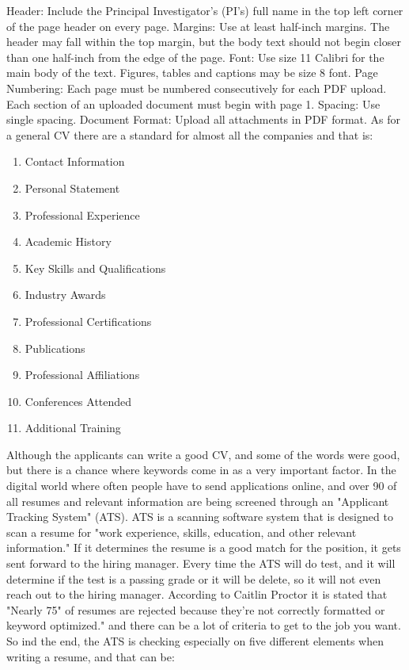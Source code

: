 Header: Include the Principal Investigator’s (PI’s) full name in the top left corner of the page header on every page.
Margins: Use at least half-inch margins. The header may fall within the top margin, but the body text should not begin closer than one half-inch from the edge of the page.
Font: Use size 11 Calibri for the main body of the text. Figures, tables and captions may be size 8 font.
Page Numbering: Each page must be numbered consecutively for each PDF upload. Each section of an uploaded document must begin with page 1.
Spacing: Use single spacing.
Document Format: Upload all attachments in PDF format.\cite{CV_for_PCori}
As for a general CV there are a standard for almost all the companies and that is:
\begin{enumerate}

   \item Contact Information
   \item Personal Statement
   \item Professional Experience
   \item Academic History
   \item Key Skills and Qualifications
   \item Industry Awards
   \item Professional Certifications
   \item Publications
   \item Professional Affiliations
   \item Conferences Attended
   \item Additional Training\cite{Format_for_CV}
   \end{enumerate}

Although the applicants can write a good CV, and some of the words were good,
but there is a chance where keywords come in as a very important factor. In the digital world where often people have to send applications online, and over 90 %
of all resumes and relevant information are being screened through an "Applicant Tracking System" (ATS). ATS is a scanning software system
that is designed to scan a resume for "work experience, skills, education, and other relevant information."\cite{ATS}
If it determines the resume is a good match for the position, it gets sent forward to the hiring manager.
Every time the ATS will do test, and it will determine if the test is a passing grade or it will be delete, so it will not even reach out to the hiring manager.
According to Caitlin Proctor it is stated that "Nearly 75"
of resumes are rejected because they’re not correctly formatted or keyword optimized." and there can be a lot of criteria
to get to the job you want.\cite{ATS}
So ind the end, the ATS is checking especially on five different elements when writing a resume, and that can be:

